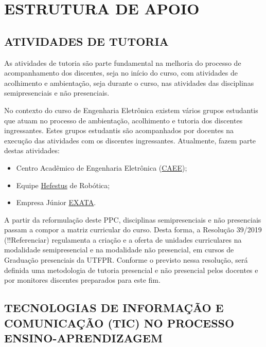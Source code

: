 \chapter{ESTRUTURA DE APOIO}


\section{ATIVIDADES DE TUTORIA}

As atividades de tutoria são parte fundamental na melhoria do processo de acompanhamento dos discentes, seja no início do curso, com atividades de acolhimento e ambientação, seja durante o curso, nas atividades das disciplinas semipresenciais e não presenciais.

No contexto do curso de Engenharia Eletrônica existem vários grupos estudantis que atuam no processo de ambientação, acolhimento e tutoria dos discentes ingressantes. Estes grupos estudantis são acompanhados por docentes na execução das atividades com os discentes ingressantes. Atualmente, fazem parte destas atividades:

\begin{itemize}
    \item Centro Acadêmico de Engenharia Eletrônica (\href{facebook.com/caee.utf.td}{CAEE});
    \item Equipe \href{facebook.com/hefestus.utfpr}{Hefestus} de Robótica;
    \item Empresa Júnior \href{exata.org.br}{EXATA}.
\end{itemize}
    
A partir da reformulação deste PPC, disciplinas semipresenciais e não presenciais passam a compor a matriz curricular do curso. Desta forma, a Resolução 39/2019  (!!Referenciar) regulamenta a criação e a oferta de unidades curriculares na modalidade semipresencial e na modalidade não presencial, em cursos de Graduação presenciais da UTFPR. Conforme o previsto nessa resolução, será definida uma metodologia de tutoria presencial e não presencial pelos docentes e por monitores discentes preparados para este fim.

\section{TECNOLOGIAS DE INFORMAÇÃO E COMUNICAÇÃO (TIC) NO PROCESSO ENSINO-APRENDIZAGEM}
\label{sec:tic}


